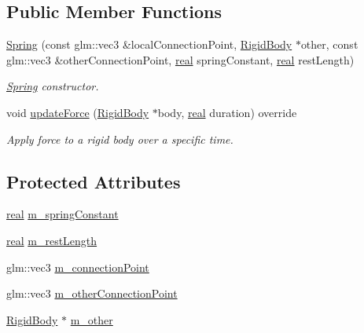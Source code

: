 \subsection*{Public Member Functions}
\begin{DoxyCompactItemize}
\item 
\mbox{\hyperlink{classr3_1_1_spring_ae96ec521b5609d2ace1476aec3c831f3}{Spring}} (const glm\+::vec3 \&local\+Connection\+Point, \mbox{\hyperlink{classr3_1_1_rigid_body}{Rigid\+Body}} $\ast$other, const glm\+::vec3 \&other\+Connection\+Point, \mbox{\hyperlink{namespacer3_ab2016b3e3f743fb735afce242f0dc1eb}{real}} spring\+Constant, \mbox{\hyperlink{namespacer3_ab2016b3e3f743fb735afce242f0dc1eb}{real}} rest\+Length)
\begin{DoxyCompactList}\small\item\em \mbox{\hyperlink{classr3_1_1_spring}{Spring}} constructor. \end{DoxyCompactList}\item 
void \mbox{\hyperlink{classr3_1_1_spring_a3305adfd568606ed9ae6fb589f20446b}{update\+Force}} (\mbox{\hyperlink{classr3_1_1_rigid_body}{Rigid\+Body}} $\ast$body, \mbox{\hyperlink{namespacer3_ab2016b3e3f743fb735afce242f0dc1eb}{real}} duration) override
\begin{DoxyCompactList}\small\item\em Apply force to a rigid body over a specific time. \end{DoxyCompactList}\end{DoxyCompactItemize}
\subsection*{Protected Attributes}
\begin{DoxyCompactItemize}
\item 
\mbox{\hyperlink{namespacer3_ab2016b3e3f743fb735afce242f0dc1eb}{real}} \mbox{\hyperlink{classr3_1_1_spring_a06963e33fd2c3f8e25ddd345324b292b}{m\+\_\+spring\+Constant}}
\item 
\mbox{\hyperlink{namespacer3_ab2016b3e3f743fb735afce242f0dc1eb}{real}} \mbox{\hyperlink{classr3_1_1_spring_ad1c8ba98c782bee7f9896d0c868b9ee7}{m\+\_\+rest\+Length}}
\item 
glm\+::vec3 \mbox{\hyperlink{classr3_1_1_spring_a3c1e08e176ebc363b9f217875036955d}{m\+\_\+connection\+Point}}
\item 
glm\+::vec3 \mbox{\hyperlink{classr3_1_1_spring_a7a1c5a5c2960bbf756dac88986e939ae}{m\+\_\+other\+Connection\+Point}}
\item 
\mbox{\hyperlink{classr3_1_1_rigid_body}{Rigid\+Body}} $\ast$ \mbox{\hyperlink{classr3_1_1_spring_ac762f73af2e30d8f6f1e6b0a1575d49e}{m\+\_\+other}}
\end{DoxyCompactItemize}
